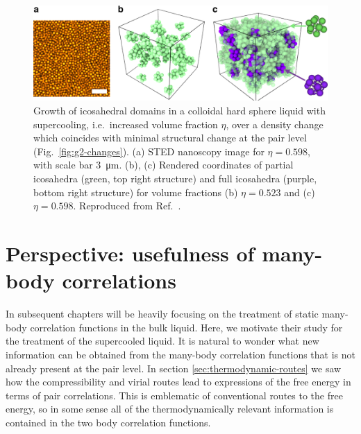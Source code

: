 \documentclass[11pt,twoside]{report}
\begin{document}

\begin{figure}
  \includegraphics[width=\linewidth,outer]{icosahedra-hallett}
  \caption[Growth of icosahedral domains in the supercooled hard sphere liquid]{
    Growth of icosahedral domains in a colloidal hard sphere liquid with supercooling, i.e.\ increased volume fraction $\eta$, over a density change which coincides with minimal structural change at the pair level (Fig.\ \ref{fig:g2-changes}).
    (a) STED nanoscopy image for $\eta = 0.598$, with scale bar \SI{3}{\micro\meter}.
    (b), (c) Rendered coordinates of partial icosahedra (green, top right structure) and full icosahedra (purple, bottom right structure) for volume fractions (b) $\eta = 0.523$ and (c) $\eta = 0.598$.
    Reproduced from Ref.\ \cite{HallettNC2018}.
  }
  \label{fig:icosahedral-domains}
\end{figure}

\section{Perspective: usefulness of many-body correlations}
\label{sec:correlation-perspective}

In subsequent chapters will be heavily focusing on the treatment of static many-body correlation functions in the bulk liquid.
Here, we motivate their study for the treatment of the supercooled liquid.
It is natural to wonder what new information can be obtained from the many-body correlation functions that is not already present at the pair level.
In section \ref{sec:thermodynamic-routes} we saw how the compressibility and virial routes lead to expressions of the free energy in terms of pair correlations.
This is emblematic of conventional routes to the free energy, so in some sense all of the thermodynamically relevant information is contained in the two body correlation functions.
\end{document}

